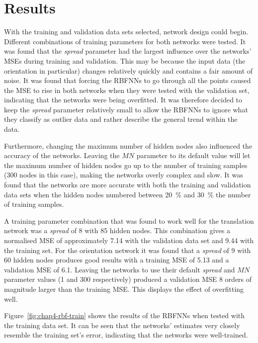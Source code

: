 \section{Results}

With the training and validation data sets selected, network design could begin. Different combinations of training parameters for both networks were tested. It was found that the \emph{spread} parameter had the largest influence over the networks' MSEs during training and validation. This may be because the input data (the orientation in particular) changes relatively quickly and contains a fair amount of noise. It was found that forcing the RBFNNs to go through all the points caused the MSE to rise in both networks when they were tested with the validation set, indicating that the networks were being overfitted. It was therefore decided to keep the \emph{spread} parameter relatively small to allow the RBFNNs to ignore what they classify as outlier data and rather describe the general trend within the data. 

Furthermore, changing the maximum number of hidden nodes also influenced the accuracy of the networks. Leaving the $\mathit{MN}$ parameter to its default value will let the maximum number of hidden nodes go up to the number of training samples (300 nodes in this case), making the networks overly complex and slow. It was found that the networks are more accurate with both the training and validation data sets when the hidden nodes numbered between 20~\% and 30~\% the number of training samples. 

A training parameter combination that was found to work well for the translation network was a \emph{spread} of 8 with 85 hidden nodes. This combination gives a normalised MSE of approximately 7.14 with the validation data set and 9.44 with the training set. For the orientation network it was found that a \emph{spread} of 9 with 60 hidden nodes produces good results with a training MSE of 5.13 and a validation MSE of 6.1. Leaving the networks to use their default \emph{spread} and $\mathit{MN}$ parameter values (1 and 300 respectively) produced a validation MSE 8 orders of magnitude larger than the training MSE\@. This displays the effect of overfitting well. 

Figure~\ref{fig:chap4-rbf-train} shows the results of the RBFNNs when tested with the training data set. It can be seen that the networks' estimates very closely resemble the training set's error, indicating that the networks were well-trained. 

